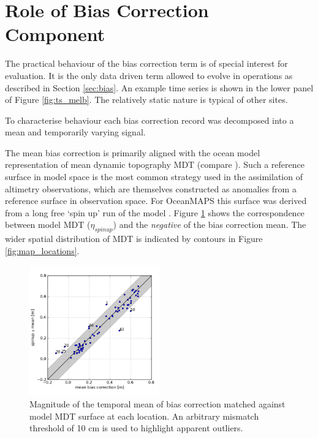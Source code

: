 \section{Role of Bias Correction Component}
\label{sec:bias_more}

The practical behaviour of the bias correction term is of special interest for evaluation.   
It is the only data driven term allowed to evolve in operations as described in Section \ref{sec:bias}.
An example time series is shown in the lower panel of Figure \ref{fig:ts_melb}.
The relatively static nature is typical of other sites.


To characterise behaviour each bias correction record was decomposed into a mean and temporarily varying signal.

The mean bias correction is primarily aligned with the ocean model representation of mean dynamic topography MDT (compare \cite{Slobbe:wk}).
Such a reference surface in model space is the most common strategy used in the assimilation of altimetry observations, which are themselves constructed as anomalies from a reference surface in observation space. For OceanMAPS this surface was derived from a long free `spin up' run of the model \cite{Oke:2013fm}. 
Figure \ref{fig:bias_mean} shows the correspondence between model MDT ($\eta_{spinup}$) and the \textit{negative} of the bias correction mean.   The wider spatial distribution of MDT is indicated by contours in Figure \ref{fig:map_locations}.

\begin{figure}[H]
\centering
\includegraphics[width=0.5\textwidth]{figures/plots/aggSL_bias_breakdown_plot_1.png}
\caption{ Magnitude of the temporal mean of bias correction matched against model MDT surface at each location. An arbitrary mismatch threshold of 10 cm is used to highlight apparent outliers.}\vspace{-6pt}
\label{fig:bias_mean}
\end{figure}   

